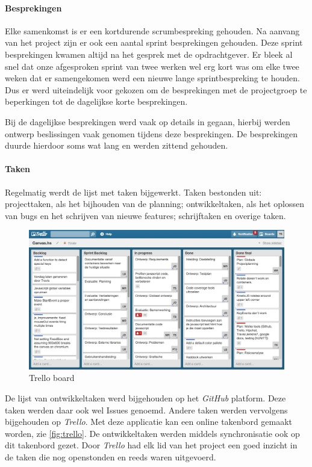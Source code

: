 \paragraph{Besprekingen} Elke samenkomst is er een kortdurende scrumbespreking gehouden. Na aanvang van het project zijn er ook een aantal sprint besprekingen gehouden. Deze sprint besprekingen kwamen altijd na het gesprek met de opdrachtgever. Er bleek al snel dat onze afgesproken sprint van twee werken wel erg kort was om elke twee weken dat er samengekomen werd een nieuwe lange sprintbespreking te houden. Dus er werd uiteindelijk voor gekozen om de besprekingen met de projectgroep te beperkingen tot de dagelijkse korte besprekingen.

Bij de dagelijkse besprekingen werd vaak op details in gegaan, hierbij werden ontwerp beslissingen vaak genomen tijdens deze besprekingen. De besprekingen duurde hierdoor soms wat lang en werden zittend gehouden.

\paragraph{Taken}
Regelmatig werdt de lijst met taken bijgewerkt. Taken bestonden uit: projecttaken, als het bijhouden van de planning; ontwikkeltaken, als het oplossen van bugs en het schrijven van nieuwe features; schrijftaken en overige taken.

\begin{figure}[H]
\begin{center}
\includegraphics[keepaspectratio,width=\textwidth]{./images/trello.png}
\caption{Trello board}
\label{fig:trello}
\end{center}
\end{figure}

De lijst van ontwikkeltaken werd bijgehouden op het \emph{GitHub} platform. Deze taken werden daar ook wel Issues genoemd. Andere taken werden vervolgens bijgehouden op \emph{Trello}. Met deze applicatie kan een online takenbord gemaakt worden, zie \autoref{fig:trello}. De ontwikkeltaken werden middels synchronisatie ook op dit takenbord gezet. Door \emph{Trello} had elk lid van het project een goed inzicht in de taken die nog openstonden en reeds waren uitgevoerd.

